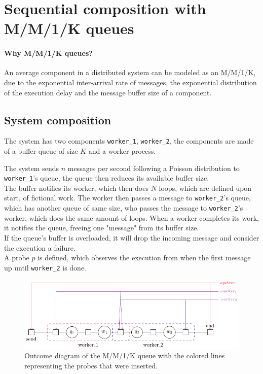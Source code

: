 \section{Sequential composition with M/M/1/K queues}
    \paragraph{Why M/M/1/K queues?} An average component in a distributed system can be modeled as an M/M/1/K, due to the exponential inter-arrival rate of messages, the exponential distribution of the execution delay and the message buffer size of a component.
    
    \subsection{System composition}
    The system has two components \texttt{worker\_1}, \texttt{worker\_2}, the components are made of a buffer queue of size $K$ and a worker process.
    
    The system sends $n$ messages per second following a Poisson distribution to \texttt{worker\_1}'s queue, the queue then reduces its available buffer size. \\
    
    The buffer notifies its worker, which then does $N$ loops, which are defined upon start, of fictional work. The worker then passes a message to \texttt{worker\_2}'s queue, which has another queue of same size, who passes the message to \texttt{worker\_2}'s worker, which does the same amount of loops. When a worker completes its work, it notifies the queue, freeing one "message" from its buffer size. \\
    
    If the queue's buffer is overloaded, it will drop the incoming message and consider the execution a failure. \\
    
    A probe $p$ is defined, which observes the execution from when the first message up until \texttt{worker\_2} is done.
    \begin{figure}[H]
        \begin{center}
            \includegraphics[scale=1.2, width=\textwidth]{tikz/mm1k.pdf} 
        \end{center}
        \caption{Outcome diagram of the M/M/1/K queue with the colored lines representing the probes that were inserted.}
        \label{fig:mm1k}
    \end{figure}

